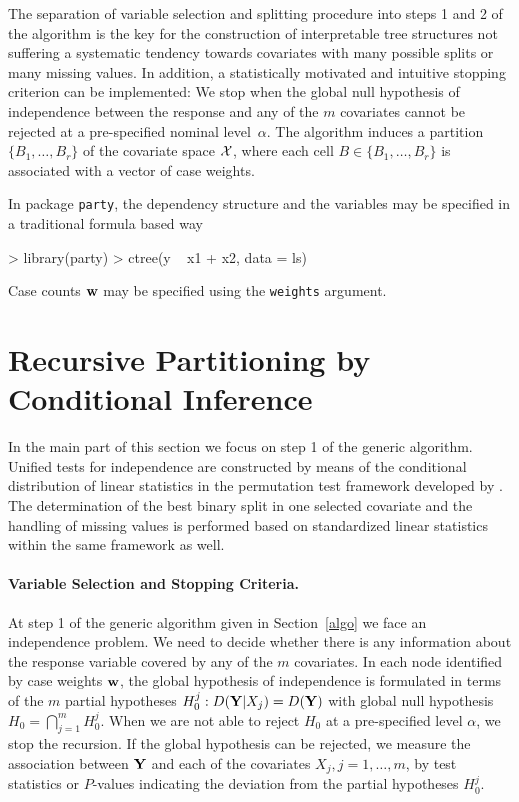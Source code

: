 \documentclass[letter]{article}
\begin{document}
The separation of variable
selection and splitting procedure into steps 1 and 2 of the algorithm
is the key for the construction of interpretable tree
structures not suffering a systematic tendency towards covariates with many
possible splits or many missing values. In addition, a statistically
motivated and intuitive stopping criterion can be implemented: We stop 
when the global null hypothesis of independence between the
response and any of the $m$ covariates cannot be rejected at a pre-specified
nominal level~$\alpha$. The algorithm induces a partition $\{B_1, \dots, B_r\}$ of
the covariate space $\mathcal{X}$, where each cell $B \in \{B_1, \dots, B_r\}$ 
is associated with a vector of case weights. 

In package \texttt{party}, the dependency structure and the variables may be
specified in a traditional formula based way
\begin{Schunk}
\begin{Sinput}
> library(party)
> ctree(y ~ x1 + x2, data = ls)
\end{Sinput}
\end{Schunk}
Case counts $\mathbf{w}$ may be specified using the \texttt{weights} argument.

\section{Recursive Partitioning by Conditional Inference \label{framework}}

In the main part of this section we focus on step 1 of the generic algorithm.
Unified tests for independence are constructed by means of the conditional
distribution of linear statistics in the permutation test framework
developed by \cite{StrasserWeber1999}. The determination of the best binary split
in one selected covariate and the handling of missing values
is performed based on standardized linear statistics within the same
framework as well. 

\paragraph{Variable Selection and Stopping Criteria.}
At step 1 of the generic algorithm given in Section~\ref{algo} we face an 
independence problem. We need to decide whether there is any information
about the response variable covered by any of the $m$  covariates. In each node
identified by case weights $\mathbf{w}$, the
global hypothesis of independence is formulated in terms of the $m$ partial hypotheses
$H_0^j: D(\mathbf{Y} | X_j) = D(\mathbf{Y})$ with global null hypothesis $H_0 = \bigcap_{j = 1}^m
H_0^j$.
When we are not able to reject $H_0$ at a pre-specified 
level $\alpha$, we stop the recursion.
If the global hypothesis can be rejected, we measure the association
between $\mathbf{Y}$ and each of the covariates $X_j, j = 1, \dots, m$, by
test statistics or $P$-values indicating the deviation from the partial
hypotheses $H_0^j$.  
\end{document}
